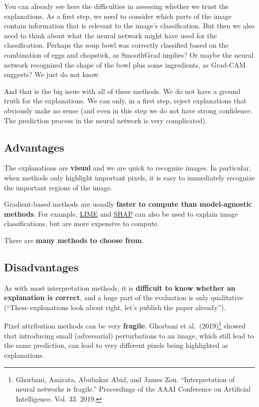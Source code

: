 \documentclass[
  11pt,
]{scrbook}
\begin{document}
You can already see here the difficulties in assessing whether we trust the explanations.
As a first step, we need to consider which parts of the image contain information that is relevant to the image's classification.
But then we also need to think about what the neural network might have used for the classification.
Perhaps the soup bowl was correctly classified based on the combination of eggs and chopstick, as SmoothGrad implies?
Or maybe the neural network recognized the shape of the bowl plus some ingredients, as Grad-CAM suggests?
We just do not know.

And that is the big issue with all of these methods.
We do not have a ground truth for the explanations.
We can only, in a first step, reject explanations that obviously make no sense (and even in this step we do not have strong confidence. The prediction process in the neural network is very complicated).

\hypertarget{advantages-19}{%
\subsection{Advantages}\label{advantages-19}}

The explanations are \textbf{visual} and we are quick to recognize images.
In particular, when methods only highlight important pixels, it is easy to immediately recognize the important regions of the image.

Gradient-based methods are usually \textbf{faster to compute than model-agnostic methods}.
For example, \protect\hyperlink{lime}{LIME} and \protect\hyperlink{shap}{SHAP} can also be used to explain image classifications, but are more expensive to compute.

There are \textbf{many methods to choose from}.

\hypertarget{disadvantages-19}{%
\subsection{Disadvantages}\label{disadvantages-19}}

As with most interpretation methods, it is \textbf{difficult to know whether an explanation is correct}, and a huge part of the evaluation is only qualitative (``These explanations look about right, let's publish the paper already'').

Pixel attribution methods can be very \textbf{fragile}.
Ghorbani et al.~(2019)\footnote{Ghorbani, Amirata, Abubakar Abid, and James Zou. ``Interpretation of neural networks is fragile.'' Proceedings of the AAAI Conference on Artificial Intelligence. Vol. 33. 2019.} showed that introducing small (adversarial) perturbations to an image, which still lead to the same prediction, can lead to very different pixels being highlighted as explanations.
\end{document}
